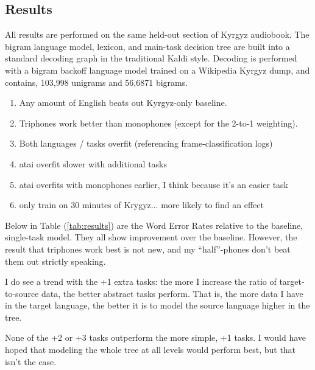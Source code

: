 \documentclass[a4paper]{article}
\begin{document}
\subsection{Results}


All results are performed on the same held-out section of Kyrgyz audiobook. The bigram language model, lexicon, and main-task decision tree are built into a standard decoding graph in the traditional Kaldi style. Decoding is performed with a bigram backoff language model trained on a Wikipedia Kyrgyz dump, and contains, 103,998 unigrams and 56,6871 bigrams.


\begin{enumerate}
\item Any amount of English beats out Kyrgyz-only baseline.
\item Triphones work better than monophones (except for the 2-to-1 weighting).
\item Both languages / tasks overfit (referencing frame-classification logs)
\item atai overfit slower with additional tasks
\item atai overfits with monophones earlier, I think because it's an easier task
\item only train on 30 minutes of Krygyz... more likely to find an effect
\end{enumerate}


Below in Table (\ref{tab:results}) are the Word Error Rates relative to the baseline, single-task model. They all show improvement over the baseline. However, the result that triphones work best is not new, and my ``half''-phones don't beat them out strictly speaking.

I do see a trend with the +1 extra tasks: the more I increase the ratio of target-to-source data, the better abstract tasks perform. That is, the more data I have in the target language, the better it is to model the source language higher in the tree.

None of the +2 or +3 tasks outperform the more simple, +1 tasks. I would have hoped that modeling the whole tree at all levels would perform best, but that isn't the case.
\end{document}
